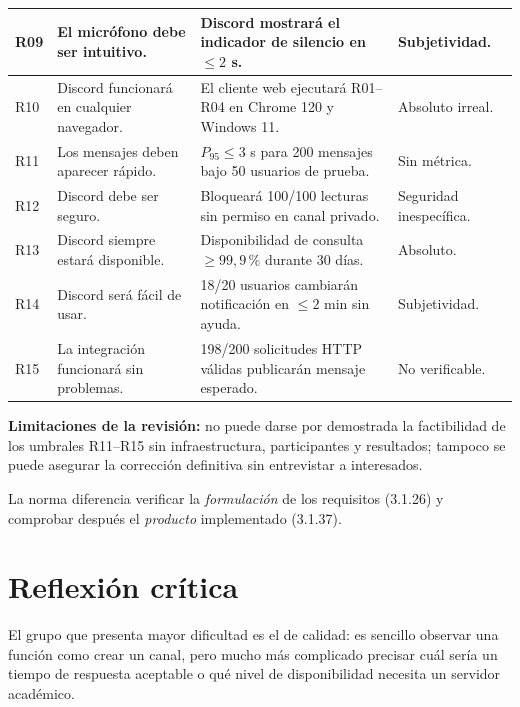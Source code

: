 \documentclass[12pt,a4paper]{article}
\begin{document}
\begin{longtable}{
    |p{0.75cm}
    |p{4.85cm}
    |p{5.8cm}
    |p{2.3cm}|
}
R09 &
El micrófono debe ser intuitivo. &
Discord mostrará el indicador de silencio en \(\leq2\) s. &
Subjetividad.\\
\hline

R10 &
Discord funcionará en cualquier navegador. &
El cliente web ejecutará R01--R04 en Chrome 120 y Windows 11. &
Absoluto irreal.\\
\hline

R11 &
Los mensajes deben aparecer rápido. &
\(P_{95}\leq3\) s para 200 mensajes bajo 50 usuarios de prueba. &
Sin métrica.\\
\hline

R12 &
Discord debe ser seguro. &
Bloqueará 100/100 lecturas sin permiso en canal privado. &
Seguridad inespecífica.\\
\hline

R13 &
Discord siempre estará disponible. &
Disponibilidad de consulta \(\geq99{,}9\)\,\% durante 30 días. &
Absoluto.\\
\hline

R14 &
Discord será fácil de usar. &
18/20 usuarios cambiarán notificación en \(\leq2\) min sin ayuda. &
Subjetividad.\\
\hline

R15 &
La integración funcionará sin problemas. &
198/200 solicitudes HTTP válidas publicarán mensaje esperado. &
No verificable.\\
\hline

\end{longtable}
\endgroup

\textbf{Limitaciones de la revisión:}
no puede darse por demostrada la factibilidad de los umbrales R11--R15 sin infraestructura, participantes y resultados; tampoco se puede asegurar la corrección definitiva sin entrevistar a interesados.

La norma diferencia verificar la \emph{formulación} de los requisitos (3.1.26) y comprobar después el \emph{producto} implementado (3.1.37).


\section{Reflexión crítica}

El grupo que presenta mayor dificultad es el de calidad: es sencillo observar una función como crear un canal, pero mucho más complicado precisar cuál sería un tiempo de respuesta aceptable o qué nivel de disponibilidad necesita un servidor académico.
\end{document}

